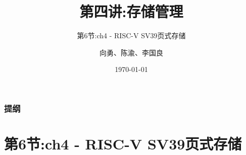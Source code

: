 


\title[第4讲]{第四讲:存储管理} %
\subtitle{第6节:ch4 - RISC-V SV39页式存储}
\author{向勇、陈渝、李国良} %
\date{\today} %



\begin{frame}
\titlepage %
\end{frame}

\begin{frame}
\frametitle{提纲} %
\tableofcontents %
\end{frame}

\section{第6节:ch4 - RISC-V SV39页式存储}%
